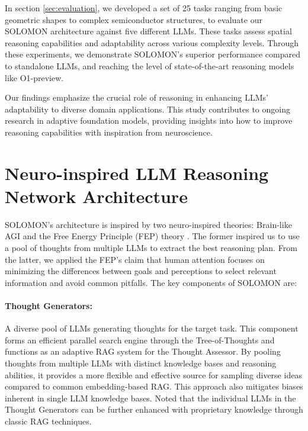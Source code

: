 \documentclass{article}
\begin{document}
In section \ref{sec:evaluation}, we developed a set of 25 tasks ranging from basic geometric shapes to complex semiconductor structures, to evaluate our SOLOMON architecture against five different LLMs. These tasks assess spatial reasoning capabilities and adaptability across various complexity levels. Through these experiments, we demonstrate SOLOMON's superior performance compared to standalone LLMs, and reaching the level of state-of-the-art reasoning models like O1-preview. 

Our findings emphasize the crucial role of reasoning in enhancing LLMs' adaptability to diverse domain applications. This study contributes to ongoing research in adaptive foundation models, providing insights into how to improve reasoning capabilities with inspiration from neuroscience.

\section{Neuro-inspired LLM Reasoning Network Architecture}
\label{sec:architecture}
SOLOMON's architecture is inspired by two neuro-inspired theories: Brain-like AGI \cite{Byrnes2022} and the Free Energy Principle (FEP) theory \cite{Parr2022}. The former inspired us to use a pool of thoughts from multiple LLMs to extract the best reasoning plan. From the latter, we applied the FEP's claim that human attention focuses on minimizing the differences between goals and perceptions to select relevant information and avoid common pitfalls. The key components of SOLOMON are:

\paragraph{Thought Generators:} A diverse pool of LLMs generating thoughts for the target task. This component forms an efficient parallel search engine through the Tree-of-Thoughts \cite{yao2023treethoughtsdeliberateproblem, zhang2024cumulativereasoninglargelanguage, Besta_2024, besta2024demystifyingchainstreesgraphs} and functions as an adaptive RAG system for the Thought Assessor. By pooling thoughts from multiple LLMs with distinct knowledge bases and reasoning abilities, it provides a more flexible and effective source for sampling diverse ideas compared to common embedding-based RAG. This approach also mitigates biases inherent in single LLM knowledge bases. Noted that the individual LLMs in the Thought Generators can be further enhanced with proprietary knowledge through classic RAG techniques.
\end{document}
